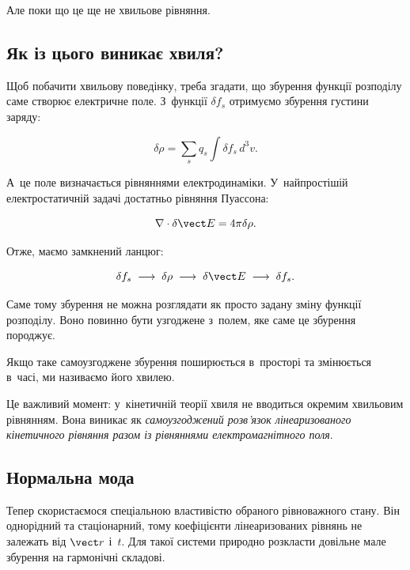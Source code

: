 Але поки що це ще не хвильове рівняння.

\subsection*{Як із цього виникає хвиля?}

Щоб побачити хвильову поведінку, треба згадати, що збурення функції розподілу саме
створює електричне поле. З~функції $\delta f_s$ отримуємо збурення густини заряду:

\begin{equation}\label{eq:kinetic-perturbed-charge}
\delta\rho
=
\sum_s q_s
\int\delta f_s\,d^3v.
\end{equation}

А~це поле визначається рівняннями електродинаміки. У~найпростішій електростатичній
задачі достатньо рівняння Пуассона:

\begin{equation}\label{eq:kinetic-perturbed-poisson}
\nabla\cdot\delta\vect E
=
4\pi\delta\rho.
\end{equation}

Отже, маємо замкнений ланцюг:

\begin{equation*}
\delta f_s
\;\longrightarrow\;
\delta\rho
\;\longrightarrow\;
\delta\vect E
\;\longrightarrow\;
\delta f_s.
\end{equation*}

Саме тому збурення не можна розглядати як просто задану зміну функції розподілу.
Воно повинно бути узгоджене з~полем, яке саме це збурення породжує.

Якщо таке самоузгоджене збурення поширюється в~просторі та змінюється в~часі, ми
називаємо його хвилею.

Це важливий момент: у~кінетичній теорії хвиля не вводиться окремим хвильовим рівнянням.
Вона виникає як \emph{самоузгоджений розв'язок лінеаризованого кінетичного рівняння
разом із рівняннями електромагнітного поля}.

\subsection*{Нормальна мода}

Тепер скористаємося спеціальною властивістю обраного рівноважного стану. Він однорідний
та стаціонарний, тому коефіцієнти лінеаризованих рівнянь не залежать від $\vect r$ і~$t$.
Для такої системи природно розкласти довільне мале збурення на гармонічні складові.

